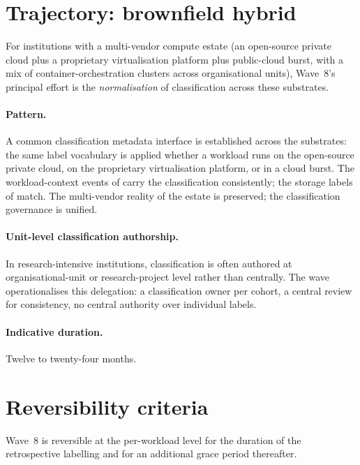 \section{Trajectory: brownfield hybrid}
\label{sec:w8-brownfield-hybrid}

For institutions with a multi-vendor compute estate (an
open-source private cloud plus a proprietary virtualisation
platform plus public-cloud burst, with a mix of
container-orchestration clusters across organisational units),
Wave~8's principal effort is the
\emph{normalisation} of classification across these substrates.

\paragraph{Pattern.} A common classification metadata interface
is established across the substrates: the same label vocabulary
is applied whether a workload runs on the open-source private
cloud, on the proprietary virtualisation platform, or
in a cloud burst. The workload-context events of
 carry the classification consistently;
the storage labels of  match. The
multi-vendor reality of the estate is preserved; the
classification governance is unified.

\paragraph{Unit-level classification authorship.} In
research-intensive institutions, classification is often
authored at organisational-unit or research-project level rather
than centrally. The wave operationalises this delegation: a
classification owner per cohort, a central review for
consistency, no central authority over individual labels.

\paragraph{Indicative duration.} Twelve to twenty-four months.

\section{Reversibility criteria}
\label{sec:w8-reversibility}

Wave~8 is reversible at the per-workload level for the duration
of the retrospective labelling and for an additional grace
period thereafter.


